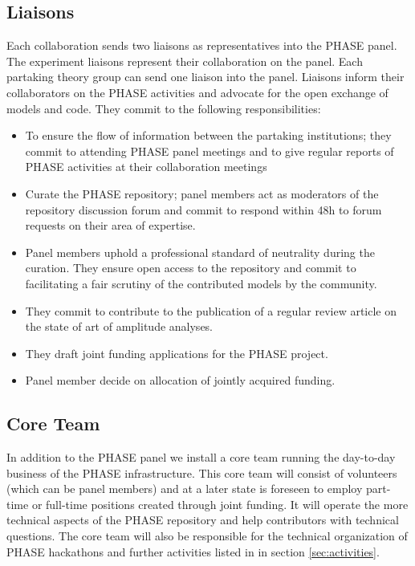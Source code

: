 \subsection{Liaisons}
Each collaboration sends two liaisons as representatives into the PHASE panel. The experiment liaisons represent their collaboration on the panel. Each partaking theory group can send one liaison into the panel. Liaisons inform their collaborators on the PHASE activities and advocate for the open exchange of models and code. They commit to the following responsibilities:
\begin{itemize}
\item To ensure the flow of information between the partaking institutions; they commit to attending PHASE panel meetings and to give regular reports of PHASE activities at their collaboration meetings
\item Curate the PHASE repository; panel members act as moderators of the repository discussion forum and commit to respond within 48h to forum requests on their area of expertise. 
\item Panel members uphold a professional standard of neutrality during the curation. They ensure open access to the repository and commit to facilitating a fair scrutiny of the contributed models by the community. 
\item They commit to contribute to the publication of a regular review article on the state of art of amplitude analyses.
\item They draft joint funding applications for the PHASE project.
\item Panel member decide on allocation of jointly acquired funding.
\end{itemize}

\subsection{Core Team}
In addition to the PHASE panel we install a core team running the day-to-day business of the PHASE infrastructure. This core team will consist of volunteers (which can be panel members) and at a later state is foreseen to employ part-time or full-time positions created through joint funding. It will operate the more technical aspects of the PHASE repository and help contributors with technical questions. The core team will also be responsible for the technical organization of PHASE hackathons and further activities listed in in section \ref{sec:activities}.

